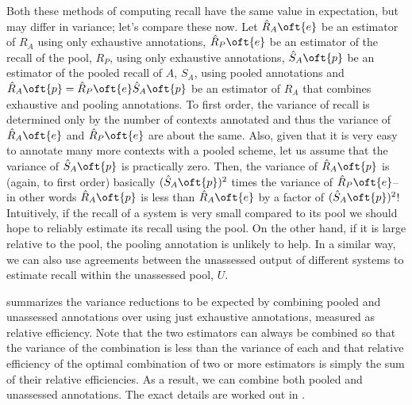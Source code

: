 Both these methods of computing recall have the same value in expectation, but may differ in variance; let's compare these now.
Let $\hat{R}_A\oft{e}$ be an estimator of $R_A$ using only exhaustive annotations, 
  $\hat{R}_P\oft{e}$ be an estimator of the recall of the pool, $R_P$, using only exhaustive annotations, 
  $\hat{S}_A\oft{p}$ be an estimator of the pooled recall of $A$, $S_A$, using pooled annotations and 
  $\hat{R}_A\oft{p} = \hat{R}_P\oft{e} \hat{S}_A\oft{p}$ be an estimator of $R_A$ that combines exhaustive and pooling annotations.
  To first order, the variance of recall is determined only by the number of contexts annotated and thus the variance of $\hat{R}_A\oft{e}$ and $\hat{R}_P\oft{e}$ are about the same.
  Also, given that it is very easy to annotate many more contexts with a pooled scheme, let us assume that the variance of $\hat{S}_A\oft{p}$ is practically zero.
  Then, the variance of $\hat{R}_A\oft{p}$ is (again, to first order) basically $(\hat{S}_A\oft{p})^2$ times the variance of $\hat{R}_P\oft{e}$-- in other words $\hat{R}_A\oft{p}$ is less than $\hat{R}_A\oft{e}$ by a factor of $(\hat{S}_A\oft{p})^2$!
Intuitively, if the recall of a system is very small compared to its pool we should hope to reliably estimate its recall using the pool.
On the other hand, if it is large relative to the pool, the pooling annotation is unlikely to help.
In a similar way, we can also use agreements between the unassessed output of different systems to estimate recall within the unassessed pool, $U$.

 summarizes the variance reductions to be expected by combining pooled and unassessed annotations over using just exhaustive annotations, measured as relative efficiency.
Note that the two estimators can always be combined so that the variance of the combination is less than the variance of each and that relative efficiency of the optimal combination of two or more estimators is simply the sum of their relative efficiencies.
As a result, we can combine both pooled and unassessed annotations.
The exact details are worked out in .
